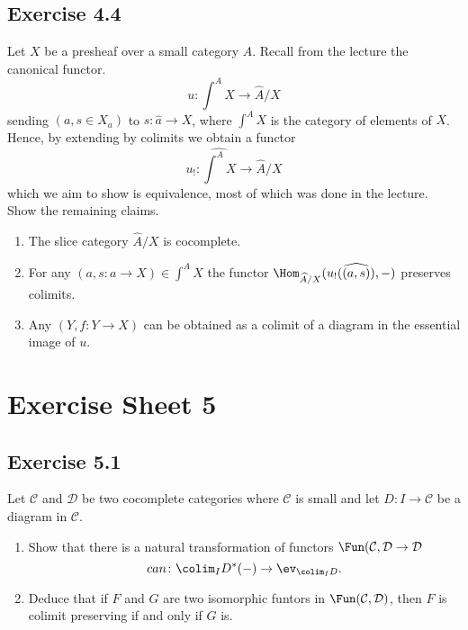 \subsection{Exercise 4.4}

Let $ X $ be a presheaf over a small category $ A $. Recall from the lecture the canonical functor.
\[
    u \colon \int^A X \to \widehat{ A } / X 
\]
sending $ ( a , s \in X_a ) $ to $ s \colon \widehat{ a } \to X $, where $ \int^A X $ is the category of elements of $ X $. 
Hence, by extending by colimits we obtain a functor
\[
    u_! \colon \widehat{\int^A X} \to \widehat{A} / X
\]
which we aim to show is equivalence, most of which was done in the lecture. 
Show the remaining claims.

\begin{enumerate}[label=(\alph*)]
    \item 
    The slice category $ \widehat{A} / X $ is cocomplete.

    \item 
    For any $ ( a , s \colon a \to X ) \in \int^A X $ the functor $ \Hom_{\widehat{A}/X} ( u_! ( \widehat{ ( a ,s )} ) , - ) $ preserves colimits.

    \item 
    Any $ ( Y , f \colon Y \to X ) $ can be obtained as a colimit of a diagram in the essential image of $ u $.
\end{enumerate}

\section{ Exercise Sheet 5 }

\subsection{ Exercise 5.1}

Let $ \mathcal{ C } $ and $ \mathcal{ D } $ be two cocomplete categories where $ \mathcal{ C } $ is small and let $  D \colon I \to \mathcal{ C } $ be a diagram in $ \mathcal{ C } $.

\begin{enumerate}[label=(\alph*)]
    \item 
    Show that there is a natural transformation of functors $ \Fun ( \mathcal{ C }, \mathcal{ D } \to \mathcal{ D } $
    \[
        can \colon \colim_I D^* ( - ) \to \ev_{ \colim_I D}.
    \]
    
    \item 
    Deduce that if $ F $ and $ G $ are two isomorphic funtors in $ \Fun ( \mathcal{ C } , \mathcal{ D } ) $, then $ F $ is colimit preserving if and only if $ G $ is.
\end{enumerate}

